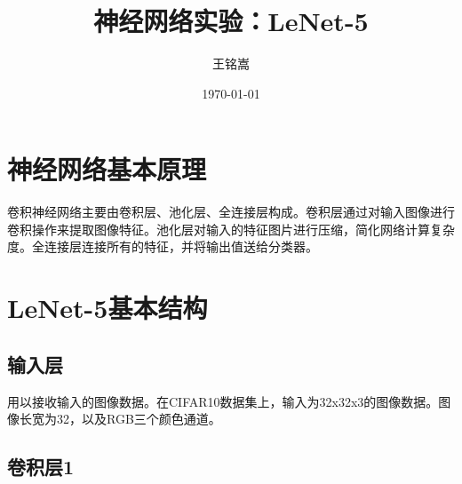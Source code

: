 \documentclass{article}
\title{神经网络实验：LeNet-5}
\author{王铭嵩}
\date{\today}
\begin{document}
\maketitle
\newpage
\section{神经网络基本原理}
卷积神经网络主要由卷积层、池化层、全连接层构成。卷积层通过对输入图像进行卷积操作来提取图像特征。池化层对输入的特征图片进行压缩，简化网络计算复杂度。全连接层连接所有的特征，并将输出值送给分类器。

\section{LeNet-5基本结构}
\subsection{输入层}
用以接收输入的图像数据。在CIFAR10数据集上，输入为32x32x3的图像数据。图像长宽为32，以及RGB三个颜色通道。
\subsection{卷积层1}
\end{document}
